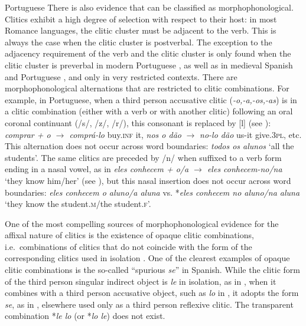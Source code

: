 \documentclass[output=paper,hidelinks]{langscibook}
\begin{document}
\ea\label{ex:Romance:2} Portuguese \citep{Crysmann1997} 
\z
\z
There is also evidence that can be classified as morphophonological. Clitics exhibit a high degree of selection with respect to their host: in most Romance languages, the clitic cluster must be adjacent to the verb. This is always the case when the clitic cluster is postverbal. The exception to the adjacency requirement of the verb and the clitic cluster is only found when the clitic cluster is preverbal in modern Portuguese \citep{Crysmann1997,LuisOtoguro2004}, as well as in medieval Spanish and Portuguese \citep{Fontana1993,Fontana1996,Fischer2002}, and only in very restricted contexts. There are morphophonological alternations that are restricted to clitic combinations. For example, in Portuguese, when a third person accusative clitic (\textit{{}-o,-a,-os,-as}) is in a clitic combination (either with a verb or with another clitic) following an oral coronal continuant (/s/, /z/, /r/), this consonant is replaced by [l] (see \citealt{Crysmann1997}): \textit{comprar + o $\rightarrow$ comprá-lo} buy.\textsc{inf} it, \textit{nos o dão} $\rightarrow$ \textit{no-lo dão} us-it give.3\textsc{pl}, etc. This alternation does not occur across word boundaries: \textit{todos os alunos} `all the students'. The same clitics are preceded by /n/ when suffixed to a verb form ending in a nasal vowel, as in \textit{eles conhecem + o/a $\rightarrow$ eles conhecem-no/na} `they know him/her' (see \citealt{Crysmann1997}), but this nasal insertion does not occur across word boundaries: \textit{eles conhecem o aluno/a aluna} vs. *\textit{eles conhecem no aluno/na aluna} `they know the student.\textsc{m}/the student.\textsc{f}'.

One of the most compelling sources of morphophonological evidence for the affixal nature of clitics is the existence of opaque clitic combinations, i.e.\ combinations of clitics that do not coincide with the form of the corresponding clitics used in isolation \citep{Bonet1995}. One of the clearest examples of opaque clitic combinations is the so-called ``spurious \textit{se}'' in Spanish. While the clitic form of the third person singular indirect object is \textit{le} in isolation, as in , when it combines with a third person accusative object, such as \textit{lo} in , it adopts the form \textit{se}, as in , elsewhere used only as a third person reflexive clitic. The transparent combination *\textit{le lo} (or *\textit{lo le}) does not exist.
\end{document}
